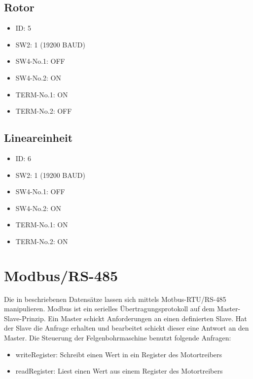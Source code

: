 \documentclass[letterpaper,10pt,english]{sphinxmanual}
\begin{document}
\subsection{Rotor}
\label{_xfcberblick:id1}\begin{itemize}
\item {} 
ID: 5

\item {} 
SW2: 1 (19200 BAUD)

\item {} 
SW4-No.1: OFF

\item {} 
SW4-No.2: ON

\item {} 
TERM-No.1: ON

\item {} 
TERM-No.2: OFF

\end{itemize}


\subsection{Lineareinheit}
\label{_xfcberblick:id2}\begin{itemize}
\item {} 
ID: 6

\item {} 
SW2: 1 (19200 BAUD)

\item {} 
SW4-No.1: OFF

\item {} 
SW4-No.2: ON

\item {} 
TERM-No.1: ON

\item {} 
TERM-No.2: ON

\end{itemize}


\section{Modbus/RS-485}
\label{_xfcberblick:modbus-rs-485}
Die in {\hyperref[_xfcberblick:ansteuerung\string-der\string-motoren]{}} beschriebenen Datensätze lassen sich mittels
Motbus-RTU/RS-485 manipulieren. Modbus ist ein serielles
Übertragungsprotokoll auf dem Master-Slave-Prinzip. Ein Master schickt Anforderungen an einen
definierten Slave. Hat der Slave die Anfrage erhalten und bearbeitet schickt dieser eine
Antwort an den Master. Die Steuerung der Felgenbohrmaschine benutzt folgende Anfragen:
\begin{itemize}
\item {} 
writeRegister: Schreibt einen Wert in ein Register des Motortreibers

\item {} 
readRegister: Liest einen Wert aus einem Register des Motortreibers

\end{itemize}
\end{document}

